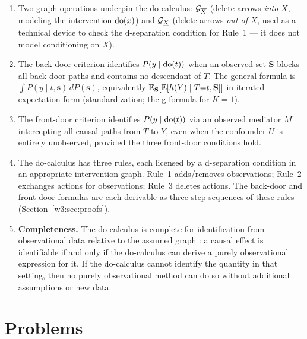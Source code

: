 \documentclass[master.tex]{subfiles}
\begin{document}
\begin{enumerate}
  \item Two graph operations underpin the do-calculus:
        $\mathcal{G}_{\overline{X}}$ (delete arrows \emph{into} $X$, modeling
        the intervention $\mathrm{do}(x)$) and $\mathcal{G}_{\underline{X}}$ (delete
        arrows \emph{out of} $X$, used as a technical device to check the
        d-separation condition for Rule~1 --- it does not model
        conditioning on $X$).

  \item The back-door criterion identifies $P(y \mid \mathrm{do}(t))$ when an
        observed set $\mathbf{S}$ blocks all back-door paths and contains
        no descendant of $T$.  The general formula is
        $\int P(y \mid t, \mathbf{s})\,dP(\mathbf{s})$,
        equivalently $\mathbb{E}_{\mathbf{S}}\!\left[\mathbb{E}[h(Y)\mid T{=}t,\mathbf{S}]\right]$
        in iterated-expectation form (standardization; the g-formula for
        $K=1$).

  \item The front-door criterion identifies $P(y \mid \mathrm{do}(t))$ via an
        observed mediator $M$ intercepting all causal paths from $T$ to
        $Y$, even when the confounder $U$ is entirely unobserved, provided
        the three front-door conditions hold.

  \item The do-calculus has three rules, each licensed by a d-separation
        condition in an appropriate intervention graph.  Rule~1 adds/removes
        observations; Rule~2 exchanges actions for observations; Rule~3
        deletes actions.  The back-door and front-door formulas are each
        derivable as three-step sequences of these rules
        (Section~\ref{w3:sec:proofs}).

  \item \textbf{Completeness.} The do-calculus is complete for
        identification from observational data relative to the assumed
        graph \citep{shpitser2006identification}: a causal effect is
        identifiable if and only if the do-calculus can derive a purely
        observational expression for it.  If the do-calculus cannot
        identify the quantity in that setting, then no purely
        observational method can do so without additional assumptions or
        new data.
\end{enumerate}

\newpage
\section*{Problems}
\end{document}
